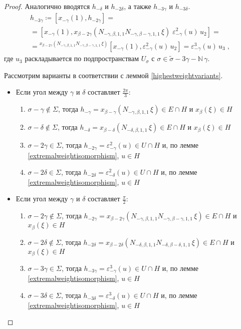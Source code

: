 \documentclass[12pt]{matmex-diploma}
\theoremstyle{mystyleni}
\theoremstyle{mystyle}
\newcommand\refb[1]{\ref{#1}}
\newcommand{\N}{\mathbb{N}}
\begin{document}
\begin{proof}
Аналогично вводятся $h_{-\delta}$ и $h_{-2\delta}$, а также $h_{-3\gamma}$ и $h_{-3\delta}$.
\begin{multline*}
h_{-3\gamma} \coloneqq [x_{-\gamma}(1),h_{-2\gamma}] = \\ =
[x_{-\gamma}(1), x_{\beta-2\gamma}(N_{-\gamma,\beta,1,1} N_{-\gamma,\beta-\gamma,1,1} \, \xi) \; \varepsilon^2_{-\gamma}(u) \, u_2] = \\ =
{}^{x_{\beta-2\gamma}(N_{-\gamma,\beta,1,1} N_{-\gamma,\beta-\gamma,1,1} \, \xi)}[x_{-\gamma}(1),\varepsilon^2_{-\gamma}(u) \, u_2] =
\varepsilon^3_{-\gamma}(u) \, u_3
 \; ,
\end{multline*}
где $u_3$ раскладывается по подпространствам $U_\sigma$ с $\sigma \in \widetilde\sigma-3\gamma - \N \, \gamma$.

Рассмотрим варианты в соответствии с леммой \refb{highestweightvariants}.
\begin{itemize}[label={\LARGE\raisebox{-0.4ex}{\textbullet}\;},leftmargin=2\parindent]
\item Если угол между $\gamma$ и $\delta$ составляет $\frac{2\pi}{3}$:
\begin{enumerate}
\item $ \sigma - \gamma \notin \Sigma$, тогда $h_{-\gamma}=x_{\beta-\gamma}(N_{-\gamma,\beta,1,1} \,\xi)\in E\cap H$ и $x_\beta(\xi)\in H$
\item $ \sigma - \delta \notin \Sigma$, тогда $h_{-\delta}=x_{\beta-\delta}(N_{-\delta,\beta,1,1} \,\xi)\in E\cap H$ и $x_\beta(\xi)\in H$
\item $ \sigma - 2\gamma \in \Sigma$, тогда $h_{-2\gamma}=\varepsilon_{-\gamma}^2(u)\in U\cap H$ и, по лемме \refb{extremalweightisomorphism}, $u\in H$
\item $ \sigma - 2\delta \in \Sigma$, тогда $h_{-2\delta}=\varepsilon_{-\delta}^2(u)\in U\cap H$ и, по лемме \refb{extremalweightisomorphism}, $u\in H$
\end{enumerate}
\item Если угол между $\gamma$ и $\delta$ составляет $\frac{\pi}{2}$:
\begin{enumerate}
\item $ \sigma - 2\gamma \notin \Sigma$, тогда $h_{-2\gamma}=x_{\beta-2\gamma}(N_{-\gamma,\beta,1,1}N_{-\gamma,\beta-\gamma,1,1} \,\xi)\in E\cap H$ и $x_\beta(\xi)\in H$
\item $ \sigma - 2\delta \notin \Sigma$, тогда $h_{-2\delta}=x_{\beta-2\delta}(N_{-\delta,\beta,1,1}N_{-\delta,\beta-\delta,1,1} \,\xi)\in E\cap H$ и $x_\beta(\xi)\in H$
\item $ \sigma - 3\gamma \in \Sigma$, тогда $h_{-3\gamma}=\varepsilon_{-\gamma}^3(u)\in U\cap H$ и, по лемме \refb{extremalweightisomorphism}, $u\in H$
\item $ \sigma - 3\delta \in \Sigma$, тогда $h_{-3\delta}=\varepsilon_{-\delta}^3(u)\in U\cap H$ и, по лемме \refb{extremalweightisomorphism}, $u\in H$
\end{enumerate}
\end{itemize}


\end{proof}
\end{document}
